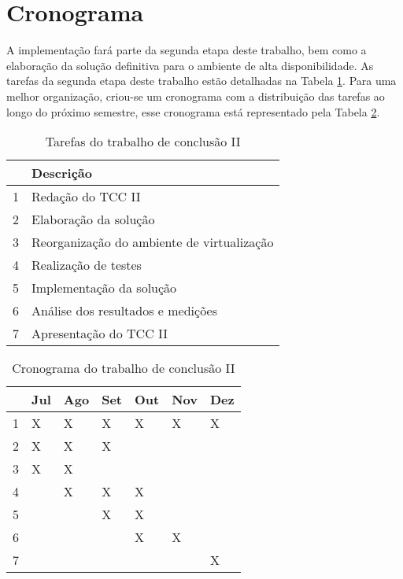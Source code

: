 \newpage
\section{Cronograma}
\label{section:cronograma}

A implementação fará parte da segunda etapa deste trabalho, bem como a elaboração da solução definitiva para o ambiente de alta disponibilidade. 
As tarefas da segunda etapa deste trabalho estão detalhadas na Tabela \ref{tab:impltarefas}. Para uma melhor organização, criou-se
um cronograma com a distribuição das tarefas ao longo do próximo semestre, esse cronograma está representado pela Tabela \ref{tab:implcronograma}.

\begin{table}[h!]\normalsize
\caption {Tarefas do trabalho de conclusão II}
\label{tab:impltarefas}
\begin{center}
\begin{tabular}{|l|l|}\hline
 & Descrição \\\hline
1 & Redação do TCC II \\\hline
2 & Elaboração da solução \\\hline
3 & Reorganização do ambiente de virtualização \\\hline
4 & Realização de testes \\\hline
5 & Implementação da solução \\\hline
6 & Análise dos resultados e medições \\\hline
7 & Apresentação do TCC II \\\hline
\end{tabular}
\end{center}
\end{table}

\begin{table}[h!]\normalsize
\caption {Cronograma do trabalho de conclusão II}
\label{tab:implcronograma}
\begin{center}
\begin{tabular}{|l|l|l|l|l|l|l|}\hline
 & Jul & Ago & Set & Out & Nov & Dez \\\hline
1 & X & X & X & X & X & X \\\hline
2 & X & X & X & & & \\\hline
3 & X & X & & & & \\\hline
4 & & X & X & X & & \\\hline
5 & & & X & X & & \\\hline
6 & & & & X & X & \\\hline
7 & & & & & & X \\\hline
\end{tabular}
\end{center}
\end{table}
